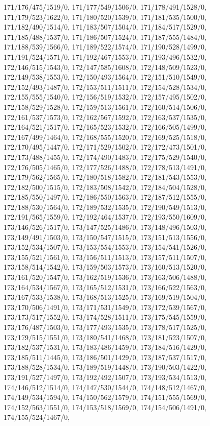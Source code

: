 {171/176/475/1519/0,%
171/177/549/1506/0,%
171/178/491/1528/0,%
171/179/523/1622/0,%
171/180/520/1539/0,%
171/181/535/1500/0,%
171/182/490/1514/0,%
171/183/507/1504/0,%
171/184/517/1529/0,%
171/185/488/1537/0,%
171/186/507/1524/0,%
171/187/555/1484/0,%
171/188/539/1566/0,%
171/189/522/1574/0,%
171/190/528/1499/0,%
171/191/524/1571/0,%
171/192/467/1553/0,%
171/193/496/1532/0,%
172/146/515/1543/0,%
172/147/585/1608/0,%
172/148/509/1523/0,%
172/149/538/1553/0,%
172/150/493/1564/0,%
172/151/510/1549/0,%
172/152/493/1487/0,%
172/153/511/1511/0,%
172/154/528/1534/0,%
172/155/555/1540/0,%
172/156/519/1532/0,%
172/157/495/1502/0,%
172/158/529/1528/0,%
172/159/513/1561/0,%
172/160/514/1506/0,%
172/161/537/1573/0,%
172/162/567/1592/0,%
172/163/537/1535/0,%
172/164/521/1517/0,%
172/165/523/1532/0,%
172/166/505/1499/0,%
172/167/499/1464/0,%
172/168/555/1520/0,%
172/169/525/1518/0,%
172/170/495/1447/0,%
172/171/529/1502/0,%
172/172/473/1501/0,%
172/173/488/1455/0,%
172/174/490/1483/0,%
172/175/529/1540/0,%
172/176/505/1465/0,%
172/177/526/1488/0,%
172/178/513/1491/0,%
172/179/562/1565/0,%
172/180/518/1582/0,%
172/181/543/1553/0,%
172/182/500/1515/0,%
172/183/508/1542/0,%
172/184/504/1528/0,%
172/185/550/1497/0,%
172/186/550/1563/0,%
172/187/512/1555/0,%
172/188/530/1564/0,%
172/189/532/1535/0,%
172/190/549/1513/0,%
172/191/565/1559/0,%
172/192/464/1537/0,%
172/193/550/1609/0,%
173/146/526/1517/0,%
173/147/525/1486/0,%
173/148/496/1503/0,%
173/149/491/1503/0,%
173/150/547/1515/0,%
173/151/513/1556/0,%
173/152/534/1507/0,%
173/153/554/1553/0,%
173/154/541/1526/0,%
173/155/521/1561/0,%
173/156/511/1513/0,%
173/157/511/1507/0,%
173/158/514/1542/0,%
173/159/503/1573/0,%
173/160/513/1520/0,%
173/161/520/1547/0,%
173/162/519/1536/0,%
173/163/506/1488/0,%
173/164/534/1567/0,%
173/165/512/1531/0,%
173/166/522/1563/0,%
173/167/533/1538/0,%
173/168/513/1525/0,%
173/169/519/1504/0,%
173/170/506/1491/0,%
173/171/531/1549/0,%
173/172/539/1567/0,%
173/173/517/1552/0,%
173/174/528/1511/0,%
173/175/545/1559/0,%
173/176/487/1503/0,%
173/177/493/1535/0,%
173/178/517/1525/0,%
173/179/515/1551/0,%
173/180/541/1468/0,%
173/181/523/1507/0,%
173/182/537/1531/0,%
173/183/486/1459/0,%
173/184/516/1429/0,%
173/185/511/1445/0,%
173/186/501/1429/0,%
173/187/537/1517/0,%
173/188/528/1534/0,%
173/189/519/1448/0,%
173/190/503/1422/0,%
173/191/527/1497/0,%
173/192/492/1507/0,%
173/193/534/1513/0,%
174/146/512/1514/0,%
174/147/530/1544/0,%
174/148/512/1467/0,%
174/149/534/1594/0,%
174/150/562/1579/0,%
174/151/555/1569/0,%
174/152/563/1551/0,%
174/153/518/1569/0,%
174/154/506/1491/0,%
174/155/524/1467/0,%
}
